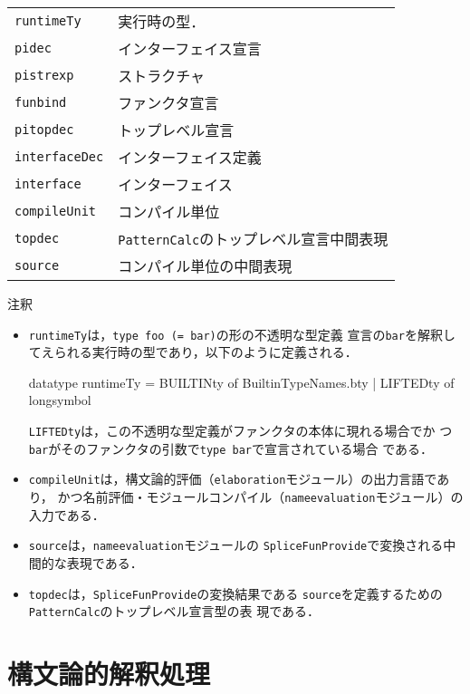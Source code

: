 \documentclass{jbook}
\newcommand{\txt}[2]{#1}
\newcommand{\code}[1]{\mbox{\large\tt #1}}
\newenvironment{programPlain}{\begin{large}\begin{tt}}%
	                     {\end{tt}\end{large}}
\begin{document}
\begin{tabular}{ll}
\code{runtimeTy} & 実行時の型．
\\
\code{pidec} & インターフェイス宣言
\\
\code{pistrexp} & ストラクチャ
\\
\code{funbind} & ファンクタ宣言
\\
\code{pitopdec} & トップレベル宣言
\\
\code{interfaceDec} & インターフェイス定義
\\
\code{interface} & インターフェイス
\\
\code{compileUnit} & コンパイル単位
\\
\code{topdec} & \code{PatternCalc}のトップレベル宣言中間表現
\\
\code{source} & コンパイル単位の中間表現
\end{tabular}

注釈
\begin{itemize}
\item \code{runtimeTy}は，\code{type foo (= bar)}の形の不透明な型定義
宣言の\code{bar}を解釈してえられる実行時の型であり，以下のように定義される．
\begin{programPlain}
datatype runtimeTy = BUILTINty of BuiltinTypeNames.bty | LIFTEDty of longsymbol
\end{programPlain}
\code{LIFTEDty}は，この不透明な型定義がファンクタの本体に現れる場合でか
つ\code{bar}がそのファンクタの引数で\code{type bar}で宣言されている場合
である．

\item \code{compileUnit}は，構文論的評価（\code{elaboration}モジュール）の出力言語であり，
かつ名前評価・モジュールコンパイル（\code{nameevaluation}モジュール）の
入力である．

\item 
	\code{source}は，\code{nameevaluation}モジュールの
\code{SpliceFunProvide}で変換される中間的な表現である．
\item \code{topdec}は，\code{SpliceFunProvide}の変換結果である
\code{source}を定義するための\code{PatternCalc}のトップレベル宣言型の表
現である．
\end{itemize}

\else%
\fi%



% 
\chapter{\txt
{構文論的解釈処理}
{Syntax Elaboration}
}
\label{chap:elaboration}
\end{document}
